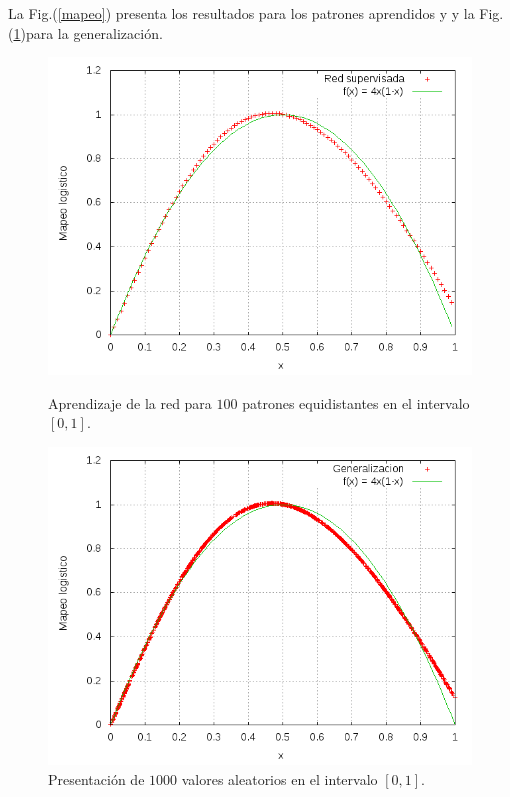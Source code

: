 \documentclass[aps,prb,onecolumn,10pt,floatfix,superscriptaddress]{article} %
\begin{document}
La Fig.(\ref{mapeo}) presenta los resultados para los patrones aprendidos y y la Fig.(\ref{general})para la generalizaci\'on.
\begin{figure}[!htd] 
	\begin{minipage}[b]{0.450\linewidth}
   	    \includegraphics[scale=0.32 ]{logistico.png}
   	    \begin{center}
  \caption{\label{mapeo} Aprendizaje de la red para $100$ patrones equidistantes en el intervalo $[0,1]$.}
     	    \end{center}
   \end{minipage}
   \begin{minipage}[b]{0.450\linewidth}
   	    \includegraphics[scale=0.32 ]{generaliza.png}
   	     \begin{center}
  \caption{\label{general} Presentaci\'on de $1000$ valores aleatorios en el intervalo $[0,1]$.}
     	    \end{center}
   \end{minipage} 
 \end{figure}
\end{document}
